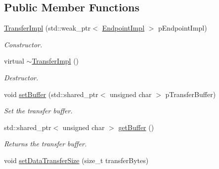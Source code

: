 \subsection*{Public Member Functions}
\begin{DoxyCompactItemize}
\item 
\hypertarget{class_lib_u_s_b_1_1_transfer_impl_a8683f55558dce7f1de4179ca6b95a97d}{\hyperlink{class_lib_u_s_b_1_1_transfer_impl_a8683f55558dce7f1de4179ca6b95a97d}{Transfer\-Impl} (std\-::weak\-\_\-ptr$<$ \hyperlink{class_lib_u_s_b_1_1_endpoint_impl}{Endpoint\-Impl} $>$ p\-Endpoint\-Impl)}\label{class_lib_u_s_b_1_1_transfer_impl_a8683f55558dce7f1de4179ca6b95a97d}

\begin{DoxyCompactList}\small\item\em Constructor. \end{DoxyCompactList}\item 
\hypertarget{class_lib_u_s_b_1_1_transfer_impl_a02458b7ba8887f7fbe096a686061deb2}{virtual \hyperlink{class_lib_u_s_b_1_1_transfer_impl_a02458b7ba8887f7fbe096a686061deb2}{$\sim$\-Transfer\-Impl} ()}\label{class_lib_u_s_b_1_1_transfer_impl_a02458b7ba8887f7fbe096a686061deb2}

\begin{DoxyCompactList}\small\item\em Destructor. \end{DoxyCompactList}\item 
\hypertarget{class_lib_u_s_b_1_1_transfer_impl_a9d0593fcc18ff8134d71e1e23cbd691b}{void \hyperlink{class_lib_u_s_b_1_1_transfer_impl_a9d0593fcc18ff8134d71e1e23cbd691b}{set\-Buffer} (std\-::shared\-\_\-ptr$<$ unsigned char $>$ p\-Transfer\-Buffer)}\label{class_lib_u_s_b_1_1_transfer_impl_a9d0593fcc18ff8134d71e1e23cbd691b}

\begin{DoxyCompactList}\small\item\em Set the transfer buffer. \end{DoxyCompactList}\item 
std\-::shared\-\_\-ptr$<$ unsigned char $>$ \hyperlink{class_lib_u_s_b_1_1_transfer_impl_a3fc5e1e955d1239ced2e15218f264d6f}{get\-Buffer} ()
\begin{DoxyCompactList}\small\item\em Returns the transfer buffer. \end{DoxyCompactList}\item 
\hypertarget{class_lib_u_s_b_1_1_transfer_impl_a06f675a9b88f4034082a4c40d91ec62c}{void \hyperlink{class_lib_u_s_b_1_1_transfer_impl_a06f675a9b88f4034082a4c40d91ec62c}{set\-Data\-Transfer\-Size} (size\-\_\-t transfer\-Bytes)}\label{class_lib_u_s_b_1_1_transfer_impl_a06f675a9b88f4034082a4c40d91ec62c}


\end{DoxyCompactItemize}
